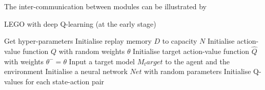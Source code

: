 \documentclass[a4paper]{article}
\begin{document}
            The inter-communication between modules can be illustrated by 
            
            
            
            \begin{algorithm}
                \caption{LEGO with deep Q-learning (at the early stage)} \label{alg:lego1}
                \begin{algorithmic}
                    \State Get hyper-parameters
                    \State Initialise replay memory $D$ to capacity $N$
                    \State Initialise action-value function $Q$ with random weights $\theta$
                    \State Initialise target action-value function $\hat{Q}$ with weights $\theta^- = \theta$
                    \State Input a target model $M_target$ to the agent and the environment
                    \State Initialise a neural network $Net$ with random parameters
                    \State Initialise Q-values for each state-action pair


\end{algorithmic}
\end{algorithm}
\end{document}
